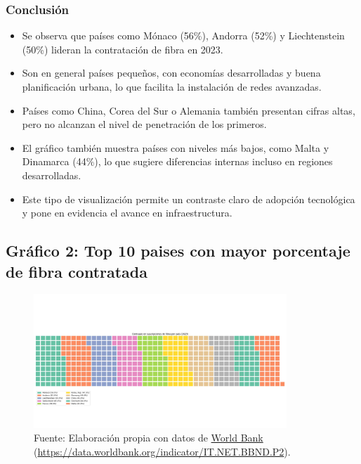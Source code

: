 \documentclass[12pt, a4paper]{article}
\begin{document}
\subsubsection*{Conclusión}
\begin{itemize}
    \item Se observa que países como Mónaco (56\%), Andorra (52\%) y Liechtenstein (50\%) lideran la contratación de fibra en 2023.
    \item Son en general países pequeños, con economías desarrolladas y buena planificación urbana, lo que facilita la instalación de redes avanzadas.
    \item Países como China, Corea del Sur o Alemania también presentan cifras altas, pero no alcanzan el nivel de penetración de los primeros.
    \item El gráfico también muestra países con niveles más bajos, como Malta y Dinamarca (44\%), lo que sugiere diferencias internas incluso en regiones desarrolladas.
    \item Este tipo de visualización permite un contraste claro de adopción tecnológica y pone en evidencia el avance en infraestructura.
\end{itemize}

\subsection*{Gráfico 2: Top 10 paises con mayor porcentaje de fibra contratada}
\begin{figure}[H]
    \centering
    \includegraphics[width=0.85\textwidth]{images/Grafico_fibra_contratada_FC2.png}
    \caption[2]{
        Fuente: Elaboración propia con datos de \href{https://data.worldbank.org}{World Bank} 
        (\url{https://data.worldbank.org/indicator/IT.NET.BBND.P2}). %
    }\end{figure}
\end{document}
